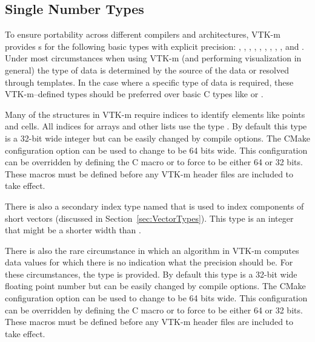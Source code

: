 \subsection{Single Number Types}

To ensure portability across different compilers and architectures, VTK-m
provides s for the following basic types with explicit
precision: , , , ,
, , , , , and
. Under most circumstances when using VTK-m (and performing
visualization in general) the type of data is determined by the source of the
data or resolved through templates. In the case where a specific type of
data is required, these VTK-m--defined types should be preferred over basic
C types like  or .

Many of the structures in VTK-m require indices to identify elements like
points and cells. All indices for arrays and other lists use the type
. By default this type is a 32-bit wide integer but can be easily
changed by compile options. The CMake configuration option
 can be used to change  to be 64
bits wide. This configuration can be overridden by defining the C macro
 or  to
force  to be either 64 or 32 bits. These macros must be defined
before any VTK-m header files are included to take effect.

There is also a secondary index type named  that is used
to index components of short vectors (discussed in
Section~\ref{sec:VectorTypes}). This type is an integer that might be a
shorter width than .

There is also the rare circumstance in which an algorithm in VTK-m computes
data values for which there is no indication what the precision should
be. For these circumstances, the type  is provided. By
default this type is a 32-bit wide floating point number but can be easily
changed by compile options. The CMake configuration option
 can be used to change
 to be 64 bits wide. This configuration can be
overridden by defining the C macro 
or  to force  to
be either 64 or 32 bits. These macros must be defined before any VTK-m
header files are included to take
effect.

